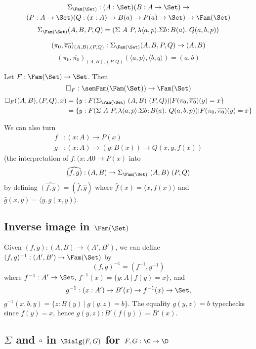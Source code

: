 \documentclass{article}
\begin{document}
\begin{multline*}
\Sigma_{\Fam(\Set)} : (A : \Set)(B : A \to \Set) \to \\
     (P : A \to \Set)(Q: (x : A) \to B(a) \to P(a) \to \Set) \to \Fam(\Set)
\end{multline*}
\[
\Sigma_{\Fam(\Set)}(A, B, P, Q) = (\Sigma\ A\ P, \lambda \langle a, p\rangle . \Sigma b\!:\!B(a).\ Q(a, b, p))
\]

\[
(\pi_0, \overline{\pi_0})_{(A, B), (P, Q)} : \Sigma_{\Fam(\Set)}(A, B, P, Q) \to (A, B)
\]
\[
(\pi_0, \overline{\pi_0})_{(A, B), (P, Q)}(\langle a, p\rangle, \langle b, q\rangle) = (a, b)
\]


Let $F : \Fam(\Set) \to \Set$. Then
\[
\square_F : \semFam(\Fam(\Set)) \to \Fam(\Set)
\]
\begin{align*}
\square_F((A, B), (P, Q), x)
 &= \{ y : F(\Sigma_{\Fam(\Set)}\ (A, B)\ (P, Q)) | F(\pi_0, \overline{\pi_0})(y) = x\} \\
 &= \{ y : F(\Sigma\ A\ P, \lambda \langle a, p\rangle . \Sigma b\!:\!B(a).\ Q(a, b, p)) | F(\pi_0, \overline{\pi_0})(y) = x\}
\end{align*}

We can also turn 
\begin{align*}
f &: (x : A) \to P(x) \\ g &: (x : A) \to (y :B(x)) \to Q(x, y, f(x))
\end{align*}
 (the interpretation of $f : (x : A0 \to P(x)$
into 
\[
\widehat{(f, g)} : (A, B) \to \Sigma_{\Fam(\Set)}\ (A, B)\ (P, Q)
\]
by defining $\widehat{(f, g)} = (\widehat{f}, \widehat{g})$ where $\widehat{f}(x) = \langle x, f(x)\rangle$ and $\widehat{g}(x, y) = \langle y, g(x, y)\rangle$.


\subsection{Inverse image in $\Fam(\Set)$}

Given $(f, g) : (A, B) \to (A', B')$, we can define $(f, g)^{-1} :
(A', B') \to \Fam(\Set)$ by
\[
(f, g)^{-1} = (f^{-1}, g^{-1})
\]
where $f^{-1} : A' \to \Set$, $f^{-1}(x) = \{ y : A\ |\ f(y) = x\}$, and 
\[
g^{-1} : (x : A') \to B'(x) \to f^{-1}(x) \to \Set,
\] 
$g^{-1}(x, b, y) = \{ z : B(y)\ |\ g(y, z) = b \}$. The equality $g(y,
z) = b$ typechecks since $f(y) = x$, hence $g(y, z) : B'(f(y)) = B'(x)$.

\subsection{$\Sigma$ and $\square$ in $\Bialg(F, G)$ for $F, G : \C \to \D$}
\end{document}

